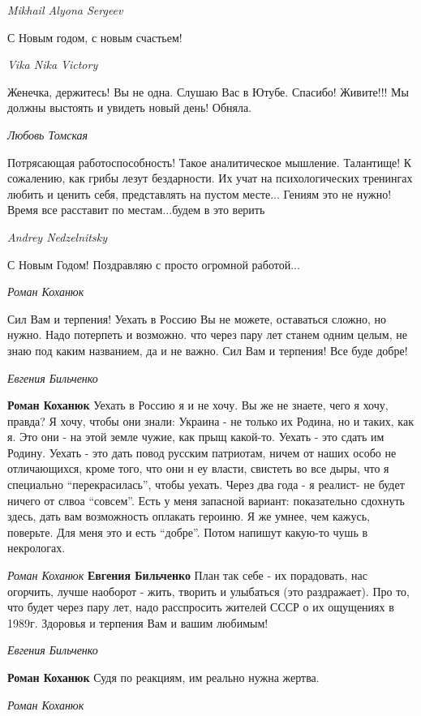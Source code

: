 \emph{Mikhail Alyona Sergeev}

С Новым годом, с новым счастьем!

\emph{Vika Nika Victory}

Женечка, держитесь! Вы не одна. Слушаю Вас в Ютубе. Спасибо! Живите!!! Мы
должны выстоять и увидеть новый день! Обняла.

\emph{Любовь Томская}

Потрясающая работоспособность! Такое аналитическое мышление. Талантище! К
сожалению, как грибы лезут бездарности. Их учат на психологических тренингах
любить и ценить себя, представлять на пустом месте... Гениям это не нужно!
Время все расставит по местам...будем в это верить

\emph{Andrey Nedzelnitsky}

С Новым Годом! Поздравляю с просто огромной работой...

\emph{Роман Коханюк}

Сил Вам и терпения! Уехать в Россию Вы не можете, оставаться сложно, но нужно.
Надо потерпеть и возможно. что через пару лет станем одним целым, не знаю под
каким названием, да и не важно. Сил Вам и терпения! Все буде добре!

\emph{Евгения Бильченко}

\textbf{Роман Коханюк} Уехать в Россию я и не хочу. Вы же не знаете, чего я
хочу, правда? Я хочу, чтобы они знали: Украина - не только их Родина, но и
таких, как я. Это они - на этой земле чужие, как прыщ какой-то. Уехать - это
сдать им Родину. Уехать - это дать повод русским патриотам, ничем от наших
особо не отличающихся, кроме того, что они н еу власти, свистеть во все дыры,
что я специально \enquote{перекрасилась}, чтобы уехать. Через два года - я реалист- не
будет ничего от слвоа \enquote{совсем}. Есть у меня запасной вариант: показательно
сдохнуть здесь, дать вам возможность оплакать героиню. Я же умнее, чем кажусь,
поверьте. Для меня это и есть \enquote{добре}. Потом напишут какую-то чушь в
некрологах.

\emph{Роман Коханюк}
\textbf{Евгения Бильченко} План так себе - их порадовать, нас огорчить, лучше
наоборот - жить, творить и улыбаться (это раздражает). Про то, что будет через
пару лет, надо расспросить жителей СССР о их ощущениях в 1989г. Здоровья и
терпения Вам и вашим любимым!

\emph{Евгения Бильченко}

\textbf{Роман Коханюк} Судя по реакциям, им реально нужна жертва.

\emph{Роман Коханюк}

